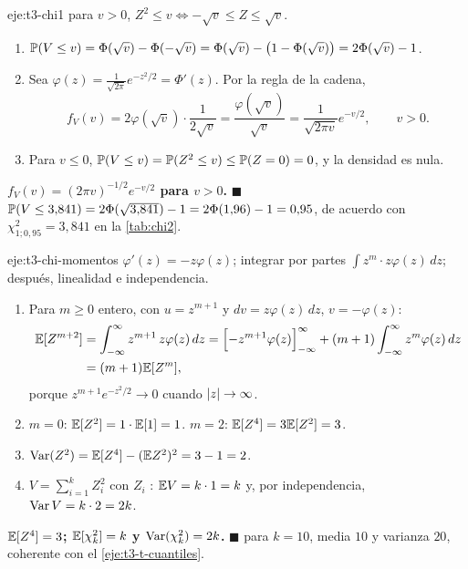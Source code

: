 \begin{solucion}{eje:t3-chi1}
\planteamiento para $v>0$, $Z^{2}\le v\iff-\sqrt v\le Z\le\sqrt v$.
\pasos
\begin{enumerate}[label=\arabic*.]
  \item $\mathbb{P}(V\le v)=\Phi(\sqrt v)-\Phi(-\sqrt v)=\Phi(\sqrt v)-\bigl(1-\Phi(\sqrt v)\bigr)=2\Phi(\sqrt v)-1$.
  \item Sea $\varphi(z)=\frac{1}{\sqrt{2\pi}}e^{-z^{2}/2}=\Phi'(z)$. Por la regla de la cadena,
  \[
  f_V(v)=2\varphi(\sqrt v)\cdot\frac{1}{2\sqrt v}=\frac{\varphi(\sqrt v)}{\sqrt v}=\frac{1}{\sqrt{2\pi v}}e^{-v/2},\qquad v>0.
  \]
  \item Para $v\le0$, $\mathbb{P}(V\le v)=\mathbb{P}(Z^{2}\le v)\le\mathbb{P}(Z=0)=0$, y la densidad es nula.
\end{enumerate}
\resultado \textbf{$f_V(v)=(2\pi v)^{-1/2}e^{-v/2}$ para $v>0$.} $\blacksquare$
\comprobacion $\mathbb{P}(V\le3{,}841)=2\Phi(\sqrt{3{,}841})-1=2\Phi(1{,}96)-1=0{,}95$, de acuerdo con $\chi^{2}_{1;0{,}95}=3{,}841$ en la \cref{tab:chi2}.
\end{solucion}

\begin{solucion}{eje:t3-chi-momentos}
\planteamiento $\varphi'(z)=-z\varphi(z)$; integrar por partes $\int z^{m}\cdot z\varphi(z)\,dz$; después, linealidad e independencia.
\pasos
\begin{enumerate}[label=\arabic*.]
  \item Para $m\ge0$ entero, con $u=z^{m+1}$ y $dv=z\varphi(z)\,dz$, $v=-\varphi(z)$:
  \[
  \begin{aligned}
  \mathbb{E}[Z^{m+2}]&=\int_{-\infty}^{\infty}z^{m+1}\,z\varphi(z)\,dz=\Bigl[-z^{m+1}\varphi(z)\Bigr]_{-\infty}^{\infty}+(m+1)\int_{-\infty}^{\infty}z^{m}\varphi(z)\,dz\\
  &=(m+1)\mathbb{E}[Z^{m}],
  \end{aligned}
  \]
  porque $z^{m+1}e^{-z^{2}/2}\to0$ cuando $\lvert z\rvert\to\infty$.
  \item $m=0$: $\mathbb{E}[Z^{2}]=1\cdot\mathbb{E}[1]=1$. $m=2$: $\mathbb{E}[Z^{4}]=3\mathbb{E}[Z^{2}]=3$.
  \item $\operatorname{Var}(Z^{2})=\mathbb{E}[Z^{4}]-(\mathbb{E} Z^{2})^{2}=3-1=2$.
  \item $V=\sum_{i=1}^{k}Z_i^{2}$ con $Z_i$ \iid: $\mathbb{E} V=k\cdot1=k$ y, por independencia, $\operatorname{Var} V=k\cdot2=2k$.
\end{enumerate}
\resultado \textbf{$\mathbb{E}[Z^{4}]=3$; $\mathbb{E}[\chi^{2}_k]=k$ y $\operatorname{Var}(\chi^{2}_k)=2k$.} $\blacksquare$
\comprobacion para $k=10$, media $10$ y varianza $20$, coherente con el \cref{eje:t3-t-cuantiles}.
\end{solucion}

